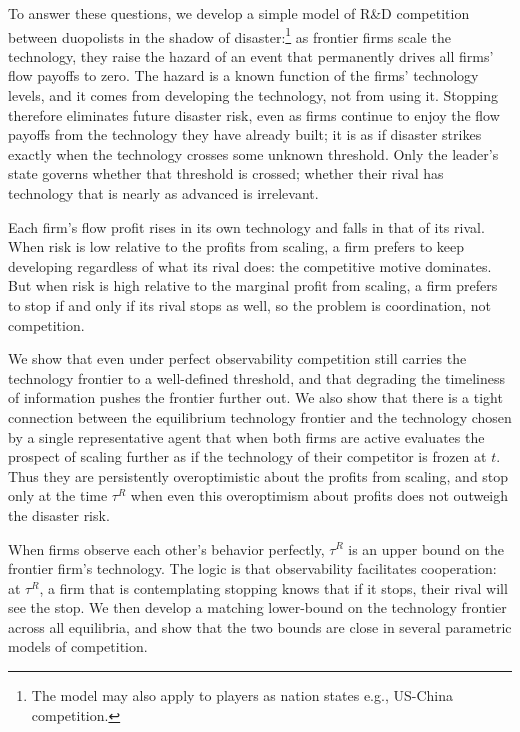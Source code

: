 \documentclass[12pt,reqno]{article}
\theoremstyle{definition} \newtheorem{example}{Example}
\theoremstyle{definition} \newtheorem{condition}{Condition}
\theoremstyle{definition} \newtheorem{corollary}{Corollary}
\theoremstyle{definition} \newtheorem{claim}{Claim}
\theoremstyle{definition} \newtheorem{definition}{Definition}
\theoremstyle{definition} \newtheorem{conjecture}{Conjecture}
\theoremstyle{definition} \newtheorem{Lemma}{Lemma}
\theoremstyle{definition} \newtheorem{lemma}{Lemma}
\theoremstyle{plain} \newtheorem{theorem}{Theorem}
\theoremstyle{definition} \newtheorem{assumption}{Assumption}
\theoremstyle{definition} \newtheorem*{assumptionnonumber}{Assumption}
\theoremstyle{definition} \newtheorem*{theoremNoNumber}{Proposition}
\theoremstyle{definition}
\theoremstyle{definition}\newtheorem{proposition}{Proposition}
\theoremstyle{definition} \newtheorem{result}{Result}
\theoremstyle{definition} \newtheorem*{definitionNoNumber}{Definition}
\theoremstyle{definition} \newtheorem{Definition}{Definition}
\theoremstyle{definition} \newtheorem*{DefinitionNoNumber}{Definition}
\theoremstyle{definition} \newtheorem*{fact}{Fact}
\theoremstyle{definition} \newtheorem*{property}{Property}
\theoremstyle{definition} \newtheorem{remark}{Remark}
\begin{document}
To answer these questions, we develop a simple model of R\&D competition between duopolists in the shadow of disaster:\footnote{The model may also apply to players as nation states e.g., US-China competition.} as frontier firms scale the technology, they raise the hazard of an event that permanently drives all firms' flow payoffs to zero. The hazard is a known function of the firms' technology levels, and it comes from developing the technology, not from using it. Stopping therefore eliminates future disaster risk, even as firms continue to enjoy the flow payoffs from the technology they have already built; it is as if disaster strikes exactly when the technology crosses some unknown threshold. Only the leader's state governs whether that threshold is crossed; whether their rival has technology that is nearly as advanced is irrelevant.

Each firm's flow profit rises in its own technology and falls in that of its rival.  When risk is low relative to the profits from scaling, a firm prefers to keep developing regardless of what its rival does: the competitive motive dominates. But when risk is high relative to the marginal profit from scaling, a firm prefers to stop if and only if its rival stops as well, so the problem is coordination, not competition.
 

 We show that even under perfect observability  competition still carries the technology frontier to a well-defined threshold, and that degrading the timeliness of information pushes the frontier further out. We also show that there is a tight connection between the equilibrium technology frontier and the technology chosen by a single representative agent that when both firms are active  evaluates the prospect of scaling further as if the technology of their  competitor is frozen at $t$. Thus they are persistently overoptimistic about the profits from scaling, and stop only at the time $\tau^R$ when even this overoptimism about profits does not outweigh the disaster risk. 

When firms observe each other's behavior perfectly, $\tau^R$ is an upper bound on the frontier firm's technology. The logic is that observability facilitates cooperation: at $\tau^R$, a firm that is contemplating stopping knows that if it 
 stops, their rival will see the stop. We then develop a matching lower-bound on the technology frontier across all equilibria, and show that the two bounds are close in several parametric models of competition. 
\end{document}
